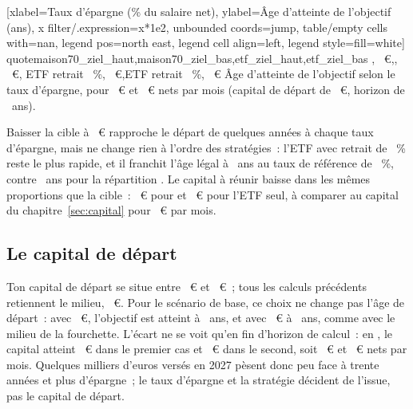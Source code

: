 [xlabel={Taux d'\'epargne (\% du salaire net)},
  ylabel={\^Age d'atteinte de l'objectif (ans)},
  x filter/.expression={x*1e2}, unbounded coords=jump,
  table/empty cells with={nan}, legend pos=north east, legend cell align=left, legend style={fill=white}]%
  {quote}{maison70_ziel_haut,maison70_ziel_bas,etf_ziel_haut,etf_ziel_bas}%
  {{\ReferenzStrategie, \ZielMonat~€},{\ReferenzStrategie, \ZielNiedrigMonat~€},
   {ETF retrait \TauxRetrait~\%, \ZielMonat~€},{ETF retrait \TauxRetrait~\%, \ZielNiedrigMonat~€}}%
  {\^Age d'atteinte de l'objectif selon le taux d'\'epargne, pour \ZielMonat~€ et
  \ZielNiedrigMonat~€ nets par mois (capital de d\'epart de \KapitalDepartMitte~€, horizon de
  \HorizonJahre~ans).\label{fig:alter-ziel-vergleich}}

Baisser la cible \`a \ZielNiedrigMonat~€ rapproche le d\'epart de quelques ann\'ees \`a chaque taux
d'\'epargne, mais ne change rien \`a l'ordre des strat\'egies~: l'ETF avec retrait de
\TauxRetrait~\% reste le plus rapide, et il franchit l'\^age l\'egal \`a
\AlterEtfReferenzDreissigNiedrig~ans au taux de r\'ef\'erence de \ReferenzSparquote~\%, contre
\AlterMaisonSiebzigDreissigNiedrig~ans pour la r\'epartition \ReferenzStrategie{}. Le capital \`a
r\'eunir baisse dans les m\^emes proportions que la cible~: \KapitalNiedrigMaisonSiebzig~€ pour
\ReferenzStrategie{} et \KapitalNiedrigEtf~€ pour l'ETF seul, \`a comparer au capital du
chapitre~\ref{sec:capital} pour \ZielMonat~€ par mois.

\subsection{Le capital de d\'epart}\label{sec:accu-depart}

Ton capital de d\'epart se situe entre \KapitalDepartNiedrig~€ et \KapitalDepartHoch~€~; tous les
calculs pr\'ec\'edents retiennent le milieu, \KapitalDepartMitte~€. Pour le sc\'enario de base, ce
choix ne change pas l'\^age de d\'epart~: avec \KapitalDepartNiedrig~€, l'objectif est atteint \`a
\AlterBasisDepartNiedrig~ans, et avec \KapitalDepartHoch~€ \`a \AlterBasisDepartHoch~ans, comme avec
le milieu de la fourchette. L'\'ecart ne se voit qu'en fin d'horizon de calcul~: en \AnneeHorizonFin,
le capital atteint \KapitalHorizonDepartNiedrig~€ dans le premier cas et \KapitalHorizonDepartHoch~€
dans le second, soit \RevenuHorizonDepartNiedrig~€ et \RevenuHorizonDepartHoch~€ nets par mois.
Quelques milliers d'euros vers\'es en 2027 p\`esent donc peu face \`a trente ann\'ees et plus
d'\'epargne~; le taux d'\'epargne et la strat\'egie d\'ecident de l'issue, pas le capital de d\'epart.

